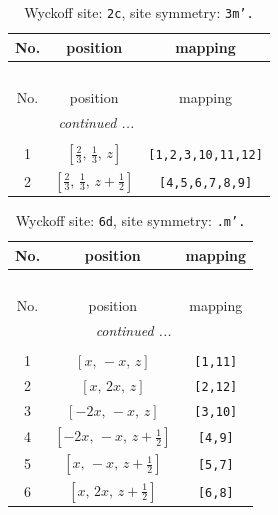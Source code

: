 \documentclass[fleqn,8pt]{jsarticle}
\begin{document}
\renewcommand{\arraystretch}{1.2}
\begin{longtable}{ccc}
\caption{Wyckoff site: {\tt 2c}, site symmetry: {\tt 3m'.}}
 \\
 \hline \hline
No. & position & mapping \\ \hline \endfirsthead

\multicolumn{2}{l}{\tablename\ \thetable{}} \\
 \hline \hline
No. & position & mapping \\ \hline \endhead

 \hline \hline
\multicolumn{2}{r}{\footnotesize\it continued ...} \\ \endfoot

 \hline \hline
\multicolumn{2}{r}{} \\ \endlastfoot

1 & $\left[ \frac{2}{3},\, \frac{1}{3},\, z \right]$ & {\tt [1,2,3,10,11,12]} \\ \hline
2 & $\left[ \frac{2}{3},\, \frac{1}{3},\, z + \frac{1}{2} \right]$ & {\tt [4,5,6,7,8,9]} \\
\end{longtable}
\renewcommand{\arraystretch}{1.2}
\begin{longtable}{ccc}
\caption{Wyckoff site: {\tt 6d}, site symmetry: {\tt .m'.}}
 \\
 \hline \hline
No. & position & mapping \\ \hline \endfirsthead

\multicolumn{2}{l}{\tablename\ \thetable{}} \\
 \hline \hline
No. & position & mapping \\ \hline \endhead

 \hline \hline
\multicolumn{2}{r}{\footnotesize\it continued ...} \\ \endfoot

 \hline \hline
\multicolumn{2}{r}{} \\ \endlastfoot

1 & $\left[ x,\, - x,\, z \right]$ & {\tt [1,11]} \\ \hline
2 & $\left[ x,\, 2 x,\, z \right]$ & {\tt [2,12]} \\ \hline
3 & $\left[ - 2 x,\, - x,\, z \right]$ & {\tt [3,10]} \\ \hline
4 & $\left[ - 2 x,\, - x,\, z + \frac{1}{2} \right]$ & {\tt [4,9]} \\ \hline
5 & $\left[ x,\, - x,\, z + \frac{1}{2} \right]$ & {\tt [5,7]} \\ \hline
6 & $\left[ x,\, 2 x,\, z + \frac{1}{2} \right]$ & {\tt [6,8]} \\
\end{longtable}
\end{document}
